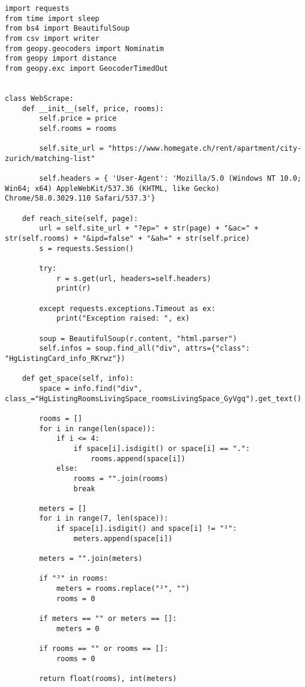 \documentclass[12pt]{article}
\begin{document}
\lstset{language=Python}
\begin{lstlisting}
import requests
from time import sleep
from bs4 import BeautifulSoup
from csv import writer
from geopy.geocoders import Nominatim
from geopy import distance
from geopy.exc import GeocoderTimedOut


class WebScrape:
    def __init__(self, price, rooms):
        self.price = price
        self.rooms = rooms

        self.site_url = "https://www.homegate.ch/rent/apartment/city-zurich/matching-list"

        self.headers = { 'User-Agent': 'Mozilla/5.0 (Windows NT 10.0; Win64; x64) AppleWebKit/537.36 (KHTML, like Gecko) Chrome/58.0.3029.110 Safari/537.3'}

    def reach_site(self, page):
        url = self.site_url + "?ep=" + str(page) + "&ac=" + str(self.rooms) + "&ipd=false" + "&ah=" + str(self.price)
        s = requests.Session()

        try:
            r = s.get(url, headers=self.headers)
            print(r)

        except requests.exceptions.Timeout as ex:
            print("Exception raised: ", ex)

        soup = BeautifulSoup(r.content, "html.parser")
        self.infos = soup.find_all("div", attrs={"class": "HgListingCard_info_RKrwz"})

    def get_space(self, info):
        space = info.find("div", class_="HgListingRoomsLivingSpace_roomsLivingSpace_GyVgq").get_text()

        rooms = []
        for i in range(len(space)):
            if i <= 4:
                if space[i].isdigit() or space[i] == ".":
                    rooms.append(space[i])
            else:
                rooms = "".join(rooms)
                break

        meters = []
        for i in range(7, len(space)):
            if space[i].isdigit() and space[i] != "²":
                meters.append(space[i])

        meters = "".join(meters)

        if "²" in rooms:
            meters = rooms.replace("²", "")
            rooms = 0

        if meters == "" or meters == []:
            meters = 0

        if rooms == "" or rooms == []:
            rooms = 0

        return float(rooms), int(meters)


\end{lstlisting}
\end{document}
